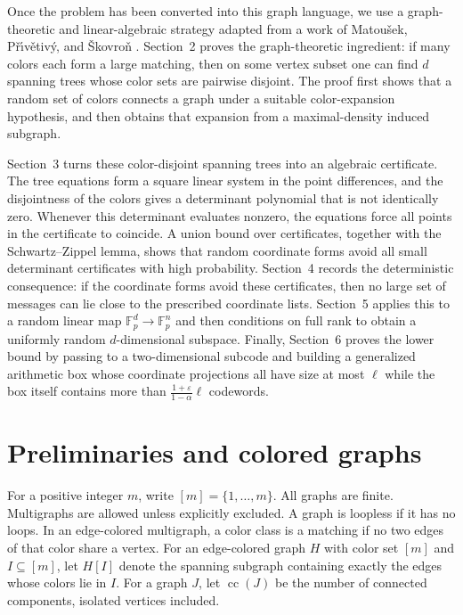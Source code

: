 \documentclass{amsart}
\theoremstyle{definition}
\theoremstyle{remark}
\newcommand{\Fp}{\mathbb{F}_p}
\DeclareMathOperator{\cc}{cc}
\begin{document}
Once the problem has been converted into this graph language, we use a graph-theoretic and linear-algebraic strategy adapted from a work of Matou\v{s}ek, P\v{r}\'{\i}v\v{e}tiv\'y, and \v{S}kovro\v{n} \cite{MPS}. Section~2 proves the graph-theoretic ingredient: if many colors each form a large matching, then on some vertex subset one can find $d$ spanning trees whose color sets are pairwise disjoint. The proof first shows that a random set of colors connects a graph under a suitable color-expansion hypothesis, and then obtains that expansion from a maximal-density induced subgraph.

Section~3 turns these color-disjoint spanning trees into an algebraic certificate. The tree equations form a square linear system in the point differences, and the disjointness of the colors gives a determinant polynomial that is not identically zero. Whenever this determinant evaluates nonzero, the equations force all points in the certificate to coincide. A union bound over certificates, together with the Schwartz--Zippel lemma, shows that random coordinate forms avoid all small determinant certificates with high probability. Section~4 records the deterministic consequence: if the coordinate forms avoid these certificates, then no large set of messages can lie close to the prescribed coordinate lists. Section~5 applies this to a random linear map $\Fp^d\to\Fp^n$ and then conditions on full rank to obtain a uniformly random $d$-dimensional subspace. Finally, Section~6 proves the lower bound by passing to a two-dimensional subcode and building a generalized arithmetic box whose coordinate projections all have size at most $\ell$ while the box itself contains more than $\frac{1+\varepsilon}{1-\alpha}\ell$ codewords.

\section{Preliminaries and colored graphs}

For a positive integer \(m\), write $[m]=\{1,\ldots,m\}$. 
All graphs are finite. Multigraphs are allowed unless explicitly excluded. A graph is loopless if it has no loops. In an edge-colored multigraph, a color class is a matching if no two edges of that color share a vertex. For an edge-colored graph \(H\) with color set \([m]\) and \(I\subseteq[m]\), let \(H[I]\) denote the spanning subgraph containing exactly the edges whose colors lie in \(I\). For a graph \(J\), let \(\cc(J)\) be the number of connected components, isolated vertices included.
\end{document}
